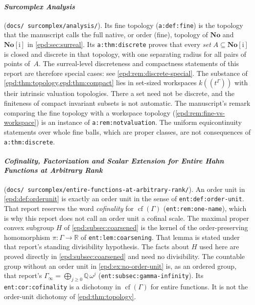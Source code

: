 \documentclass[11pt,a4paper]{article}
\numberwithin{equation}{section}
\theoremstyle{plain}
\theoremstyle{definition}
\theoremstyle{remark}
\newcommand{\No}{\mathbf{No}}
\newcommand{\R}{\mathbb R}
\newcommand{\Q}{\mathbb Q}
\begin{document}
\paragraph{\emph{Surcomplex Analysis}} (\texttt{docs/\allowbreak
surcomplex/\allowbreak analysis/}). Its fine topology
(\texttt{a:def:fine}) is the topology that the manuscript calls the full
native, or order (fine), topology of $\No$ and $\No[\mathrm i]$ in
\cref{epd:sec:surreal}. Its \texttt{a:thm:discrete} proves that every
\emph{set} $A\subseteq\No[\mathrm i]$ is closed and discrete in that
topology, with one separating radius for all pairs of points of~$A$. The
surreal-level discreteness and compactness statements of this report are
therefore special cases: see \cref{epd:rem:discrete-special}. The
substance of \cref{epd:thm:topology,epd:thm:compact} lies in set-sized
workspaces $k((t^\Gamma))$ with their intrinsic valuation topologies. There
a set need not be discrete, and the finiteness of compact invariant
subsets is not automatic. The manuscript's remark comparing the fine topology
with a workspace topology (\cref{epd:rem:fine-vs-workspace}) is an instance
of \texttt{a:rem:notvaluation}. The uniform equicontinuity statements over
whole fine balls, which are proper classes, are not consequences of
\texttt{a:thm:discrete}.

\paragraph{\emph{Cofinality, Factorization and Scalar Extension for Entire
Hahn Functions at Arbitrary Rank}} (\texttt{docs/\allowbreak
surcomplex/\allowbreak entire-functions-\allowbreak at-arbitrary-rank/}). An order unit
in \cref{epd:def:orderunit} is exactly an order unit in the sense of
\texttt{ent:def:order-unit}. That report reserves the word
\emph{cofinality} for $\operatorname{cf}(\Gamma)$
(\texttt{ent:rem:one-name}), which is why this report does not call an order
unit a cofinal scale. The maximal proper convex subgroup $H$ of
\cref{epd:subsec:coarsened} is the kernel of the order-preserving
homomorphism $\pi:\Gamma\to\R$ of \texttt{ent:lem:coarsening}. That lemma is
stated under that report's standing divisibility hypothesis. The facts about
$H$ used here are proved directly in \cref{epd:subsec:coarsened} and need no
divisibility. The countable group without an order unit in
\cref{epd:ex:no-order-unit} is, as an ordered group, that report's
$\Gamma_\infty=\bigoplus_{j\geq0}\Q\,\omega^j$
(\texttt{ent:subsec:gamma-infinity}). Its \texttt{ent:\allowbreak cor:cofinality} is a
dichotomy in $\operatorname{cf}(\Gamma)$ for entire functions. It is not
the order-unit dichotomy of \cref{epd:thm:topology}.
\end{document}
